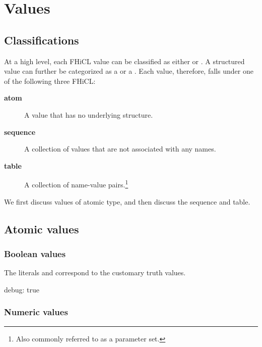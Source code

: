 \documentclass[draftmode,draftwater]{memarticle}
\newcommand{\fhicl}{FHiCL\xspace}
\begin{document}
\chapter{Values}

\section{Classifications}

At a high level, each \fhicl value can be classified as either
 or .  A structured value can further be
categorized as a  or a .  Each value,
therefore, falls under one of the following three \fhicl {}:

\begin{description}
\item [\textbf{atom}] A value that has no underlying structure.
\item [\textbf{sequence}] A collection of values that are not associated with any names.
\item [\textbf{table}] A collection of name-value pairs.\footnote{Also commonly referred to as a parameter set.}
\end{description}

We first discuss values of atomic type, and then discuss the sequence
and table.

\section{Atomic values}

\subsection{Boolean values}

The literals  and  correspond to the
customary truth values.  
%
\Needspace{0.17in}
\begin{fcllisting}[texcl,escapechar=`]
debug: true
\end{fcllisting}

\subsection{Numeric values}
%
\end{document}
